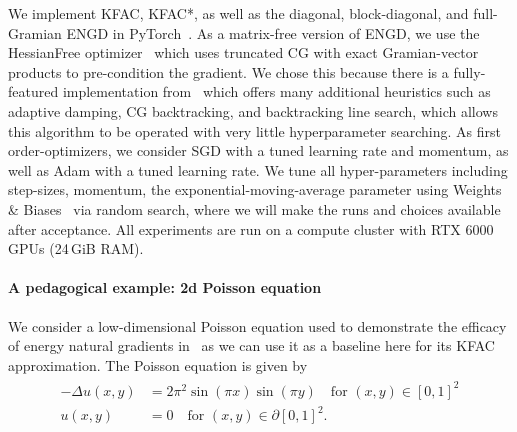 


We implement KFAC, KFAC*, as well as the diagonal, block-diagonal, and
full-Gramian ENGD in PyTorch~\citep{paszke2019pytorch}.
As a matrix-free version of ENGD, we use the HessianFree optimizer~\citep{martens2010deep} which uses truncated CG with exact Gramian-vector products to pre-condition the gradient.
We chose this because there is a fully-featured implementation from~\citet{tatzel2022late} which offers many additional heuristics such as adaptive damping, CG backtracking, and backtracking line search, which allows this algorithm to be operated with very little hyperparameter searching.
As first order-optimizers, we consider SGD with a tuned learning rate and momentum, as well as Adam with a tuned learning rate.
%
We tune all hyper-parameters including step-sizes, momentum, the exponential-moving-average parameter using Weights \& Biases~\citep{wandb} via random search, where we will make the runs and choices available after acceptance.
All experiments are run on a compute cluster with RTX 6000 GPUs (24\,GiB RAM).


\paragraph{A pedagogical example: 2d Poisson equation}

We consider a low-dimensional Poisson equation used to demonstrate the efficacy of energy natural gradients in~\cite{muller2023achieving}
as we can use it as a baseline here for its KFAC approximation.
The %
Poisson equation is given by
\begin{align}\label{eq:2D-Poisson}
    \begin{split}
        -\Delta u(x,y) & = 2\pi^2 \sin(\pi x) \sin(\pi y) \quad \text{for } (x,y)\in[0,1]^2 \\
    u(x,y) & = 0 \quad \text{for } (x,y) \in\partial[0,1]^2.
    \end{split}
\end{align}

